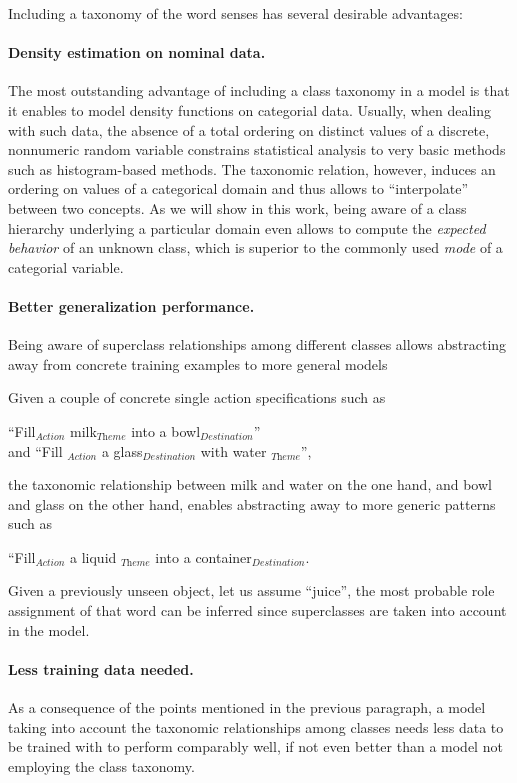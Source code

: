 \documentclass[12pt,a4paper]{article}
\begin{document}
Including a taxonomy of the word senses has several desirable advantages:

\paragraph{Density estimation on nominal data.}The most outstanding 
advantage of including a class taxonomy in a model is that it 
enables to model density functions on categorial data. Usually, when 
dealing with such data, the absence of a total ordering on distinct 
values of a discrete, nonnumeric random variable constrains 
statistical analysis to very basic methods such as histogram-based 
methods. The taxonomic relation, however, induces an ordering on 
values of a categorical domain and thus allows to ``interpolate'' 
between two concepts. As we will show in this work, being aware of a 
class hierarchy underlying a particular domain even allows to 
compute the \emph{expected behavior} of an unknown class, which is 
superior to the commonly used \emph{mode} of a categorial variable. 

\paragraph{Better generalization performance.} Being aware of 
superclass relationships among different classes allows abstracting away
from concrete training examples to more general models

 Given a couple of concrete single action specifications such as 
\begin{center} ``Fill$_{\textit{Action}}$ milk$_{\textit{Theme}}$ 
into a bowl$_{\textit{Destination}}$''\\ and ``Fill
$_{\textit{Action}}$ a glass$_{\textit{Destination}}$ with water
$_{\textit{Theme}}$'', \end{center} the taxonomic relationship 
between milk and water on the one hand, and bowl and glass on the 
other hand, enables abstracting away to more generic patterns such 
as \begin{center} ``Fill$_{\textit{Action}}$ a liquid
$_{\textit{Theme}}$ into a container$_{\textit{Destination}}$. 
\end{center}

Given a previously unseen object, let us assume ``juice'', the most 
probable role assignment of that word can be inferred since 
superclasses are taken into account in the model. 

\paragraph{Less training data needed.} As a consequence of the points 
mentioned in the previous paragraph, a model taking into account 
the taxonomic relationships among classes needs less data to be trained
with to perform comparably well, if not even better than a model not
employing the class taxonomy. 
\end{document}
